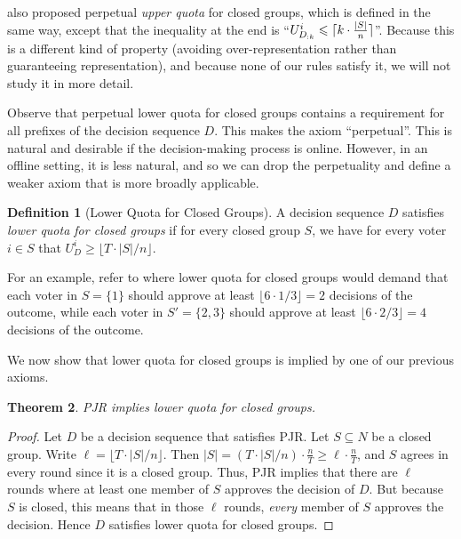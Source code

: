 \documentclass[10pt]{scrartcl}
\theoremstyle{plain}
\newtheorem{theorem}{Theorem}[section]
\theoremstyle{definition}
\newtheorem{definition}[theorem]{Definition}
\renewcommand*{\le}{\leqslant}
\renewcommand*{\ge}{\geqslant}
\renewcommand*{\geq}{\geqslant}
\begin{document}
\citet{lacknermaly2023} also proposed perpetual \emph{upper quota} for closed groups, which is defined in the same way, except that the inequality at the end is ``$U^i_{D_{:k}} \le \lceil k \cdot \smash{\frac{\left|S\right|}{n}} \rceil$''. Because this is a different kind of property (avoiding over-representation rather than guaranteeing representation), and because none of our rules satisfy it, we will not study it in more detail.



Observe that  perpetual lower quota for closed groups contains a requirement for all prefixes of the decision sequence $D$. This makes the axiom ``perpetual''. This is natural and desirable if the decision-making process is online. However, in an offline setting, it is less natural, and so we can drop the perpetuality and define a weaker axiom that is more broadly applicable. 

\begin{definition}[Lower Quota for Closed Groups]
\label{def:lqc}
A decision sequence $D$ satisfies \emph{lower quota for closed groups} if for every closed group $S$, we have for every voter $i \in S$ that  $U^i_D \geq \lfloor T \cdot |S| / n \rfloor$.
\end{definition}

For an example, refer to  where lower quota for closed groups would demand that each voter in $S = \{1\}$ should approve at least $\lfloor 6 \cdot 1 / 3 \rfloor = 2$ decisions of the outcome, while each voter in $S' = \{2, 3\}$ should approve at least $\lfloor 6 \cdot 2 / 3 \rfloor = 4$ decisions of the outcome.

We now show that lower quota for closed groups is implied by one of our previous axioms.

\begin{theorem}
    \label{thm:pjr_implies_lqc}
    PJR implies lower quota for closed groups.
\end{theorem}
\begin{proof}
Let $D$ be a decision sequence that satisfies PJR. 
Let $S \subseteq N$ be a closed group. Write $\ell = \lfloor T \cdot |S| / n \rfloor$. Then $|S| = (T \cdot |S| / n) \cdot \frac{n}{T} \ge \ell \cdot \frac{n}{T}$, and $S$ agrees in every round since it is a closed group. Thus, PJR implies that there are $\ell$ rounds where at least one member of $S$ approves the decision of $D$. But because $S$ is closed, this means that in those $\ell$ rounds, \emph{every} member of $S$ approves the decision. Hence $D$ satisfies lower quota for closed groups.
\end{proof}
\end{document}
